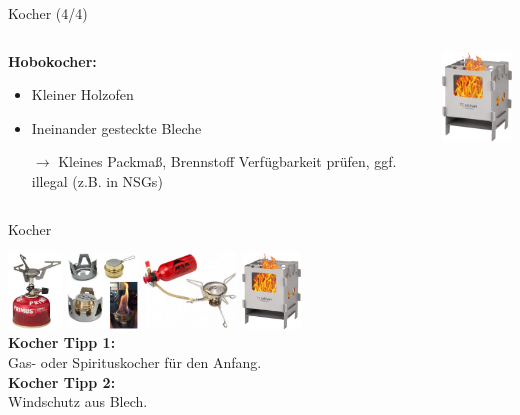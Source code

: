 \documentclass[aspectratio=169]{beamer}
\newcommand{\sarrow}{\small$\rightarrow$}
\newcommand{\tipp}[2][Tipp]{\vspace{0.2cm}\textbf{#1:}\\#2}
\begin{document}
			\begin{frame}{Kocher (4/4)}
				\begin{columns}[c]
					\begin{column}{0.69\textwidth}
						\textbf{Hobokocher:}
						\begin{itemize}
							\item Kleiner Holzofen
							\item Ineinander gesteckte Bleche
							\item[\sarrow] Kleines Packmaß, Brennstoff Verfügbarkeit prüfen, ggf. illegal (z.B. in NSGs) 
						\end{itemize}
					\end{column}
					\begin{column}{0.29\textwidth}
						\includegraphics[width=2.35cm]{images/kocher-hobo.png}
					\end{column}
				\end{columns}
			\end{frame}
		
			\begin{frame}{Kocher}
				\begin{center}
					\includegraphics[height=2cm]{images/kocher-gas.png}\hspace{1cm}
					\includegraphics[height=2cm]{images/kocher-spiritus.png}\hspace{1cm}
					\includegraphics[height=2cm]{images/kocher-benzin.png}\hspace{1cm}
					\includegraphics[height=2cm]{images/kocher-hobo.png}
					\\\pause
					\vspace{0.25cm}
					\tipp[Kocher Tipp 1]{Gas- oder Spirituskocher für den Anfang.}
					\\
					\tipp[Kocher Tipp 2]{Windschutz aus Blech.}
				\end{center}
			\end{frame}
			
\end{document}
